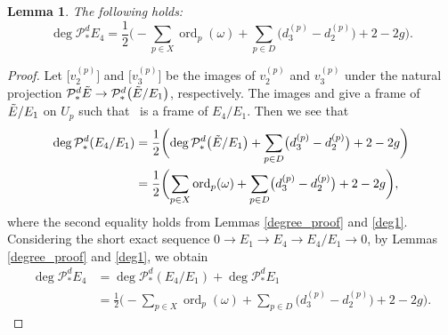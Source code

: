 \documentclass[pdftex]{sigma}
\numberwithin{equation}{section}
\newtheorem{Lemma}[Theorem]{Lemma}
\newcommand{\ord}{\operatorname{ord}}
\begin{document}
\begin{Lemma}\label{deg_E4}
 The following holds:
 \begin{equation*}
 \deg{\mathcal{P}^d_{*}E_4} = \frac{1}{2}\biggl(-\sum_{p\in X}\ord_p(\omega) + \sum_{p\in D} \bigl(d^{(p)}_3 - d^{(p)}_2\bigr) + 2-2g\biggr).
 \end{equation*}
\end{Lemma}
\begin{proof}
 Let $\bigl[v^{(p)}_2\bigr]$ and $\bigl[v^{(p)}_3\bigr]$ be the images of $v^{(p)}_2$ and $v^{(p)}_3$ under the natural projection $\mathcal{P}^d_{*}{\Tilde{E}}\to \mathcal{P}^d_{*}\bigl(\Tilde{E}/E_1\bigr)$, respectively. The images \smash{$\bigl[v^{(p)}_2\bigr]$}
 and \smash{$\bigl[v^{(p)}_3\bigr]$} give a frame of $\Tilde{E}/E_1$ on $U_p$ such that~\smash{$\bigl[v^{(p)}_2\bigr]$} is a frame of $E_4/E_1$. Then we see that
\begin{align*}
 \deg{\mathcal{P}^d_{*}(E_4/E_1)} &{}= \frac{1}{2}\biggl(\deg{\mathcal{P}^d_{*}\bigl(\Tilde{E}/E_1\bigr)} + \sum_{p\in D} \bigl(d^{(p)}_3 - d^{(p)}_2\bigr) + 2-2g\biggr)\\
 &{}= \frac{1}{2}\biggl(\sum_{p\in X}\ord_p(\omega) + \sum_{p\in D} \bigl(d^{(p)}_3 - d^{(p)}_2\bigr) + 2-2g\biggr),
 \end{align*}
where the second equality holds from Lemmas \ref{degree_proof} and \ref{deg1}.
Considering the short exact sequence $0\to E_1\to E_4\to E_4/E_1 \to 0$, by Lemmas \ref{degree_proof} and \ref{deg1}, we obtain
\begin{align*}
 \deg{\mathcal{P}^d_{*}E_4} &{}= \deg{\mathcal{P}^d_{*}(E_4/E_1)} + \deg{\mathcal{P}^d_{*}E_1} \\
 &{}= \frac{1}{2}\biggl(-\sum_{p\in X}\ord_p(\omega) + \sum_{p\in D} \bigl(d^{(p)}_3 - d^{(p)}_2\bigr) + 2-2g\biggr).
\tag*{\qed}
\end{align*}
\renewcommand{\qed}{}
\end{proof}
\end{document}
